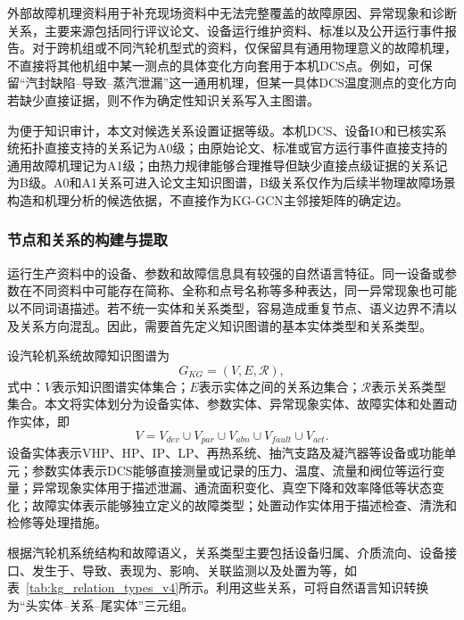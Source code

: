 外部故障机理资料用于补充现场资料中无法完整覆盖的故障原因、异常现象和诊断关系，主要来源包括同行评议论文、设备运行维护资料、标准以及公开运行事件报告。对于跨机组或不同汽轮机型式的资料，仅保留具有通用物理意义的故障机理，不直接将其他机组中某一测点的具体变化方向套用于本机DCS点。例如，可保留“汽封缺陷--导致--蒸汽泄漏”这一通用机理，但某一具体DCS温度测点的变化方向若缺少直接证据，则不作为确定性知识关系写入主图谱。

为便于知识审计，本文对候选关系设置证据等级。本机DCS、设备IO和已核实系统拓扑直接支持的关系记为A0级；由原始论文、标准或官方运行事件直接支持的通用故障机理记为A1级；由热力规律能够合理推导但缺少直接点级证据的关系记为B级。A0和A1关系可进入论文主知识图谱，B级关系仅作为后续半物理故障场景构造和机理分析的候选依据，不直接作为KG-GCN主邻接矩阵的确定边。

\subsubsection{节点和关系的构建与提取}
\label{subsubsec:entity_relation_v4}

运行生产资料中的设备、参数和故障信息具有较强的自然语言特征。同一设备或参数在不同资料中可能存在简称、全称和点号名称等多种表达，同一异常现象也可能以不同词语描述。若不统一实体和关系类型，容易造成重复节点、语义边界不清以及关系方向混乱。因此，需要首先定义知识图谱的基本实体类型和关系类型。

设汽轮机系统故障知识图谱为
\begin{equation}
G_{KG}=(V,E,\mathcal R),
\end{equation}
式中：$V$表示知识图谱实体集合；$E$表示实体之间的关系边集合；$\mathcal R$表示关系类型集合。本文将实体划分为设备实体、参数实体、异常现象实体、故障实体和处置动作实体，即
\begin{equation}
V=V_{dev}\cup V_{par}\cup V_{abn}\cup V_{fault}\cup V_{act}.
\end{equation}
设备实体表示VHP、HP、IP、LP、再热系统、抽汽支路及凝汽器等设备或功能单元；参数实体表示DCS能够直接测量或记录的压力、温度、流量和阀位等运行变量；异常现象实体用于描述泄漏、通流面积变化、真空下降和效率降低等状态变化；故障实体表示能够独立定义的故障类型；处置动作实体用于描述检查、清洗和检修等处理措施。

根据汽轮机系统结构和故障语义，关系类型主要包括设备归属、介质流向、设备接口、发生于、导致、表现为、影响、关联监测以及处置为等，如表~\ref{tab:kg_relation_types_v4}所示。利用这些关系，可将自然语言知识转换为“头实体--关系--尾实体”三元组。

